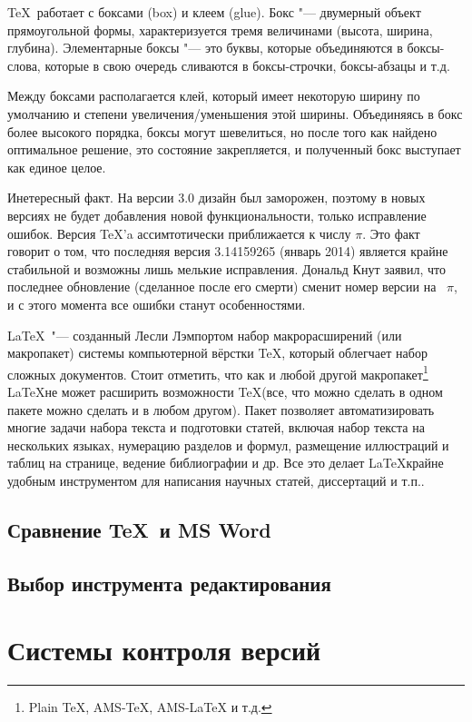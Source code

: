 \documentclass{article}
\begin{document}
		\TeX ~работает с боксами (box) и клеем (glue). Бокс "--- двумерный объект прямоугольной формы, характеризуется тремя 
величинами (высота, ширина, глубина). Элементарные боксы "--- это буквы, которые объединяются в боксы-слова, которые в свою очередь сливаются в боксы-строчки, боксы-абзацы и т.д.

        Между боксами располагается клей, который имеет некоторую ширину по умолчанию и степени увеличения/уменьшения этой ширины. Объединяясь в бокс более высокого порядка, боксы могут шевелиться, но после того как найдено оптимальное решение, это состояние закрепляется, и полученный бокс выступает как единое целое.
        
        Инетересный факт. На версии 3.0 дизайн был заморожен, поэтому в новых версиях не будет добавления новой функциональности, только исправление ошибок. Версия \TeX 'a ассимтотически приближается к числу $\pi$. Это факт говорит о том, что последняя версия	3.14159265 (январь 2014) является крайне стабильной и возможны лишь мелькие исправления. Дональд Кнут заявил, что последнее обновление (сделанное после его смерти) сменит номер версии на ~$\pi$, и с этого момента все ошибки станут особенностями.
        		
		\LaTeX ~"--- созданный Лесли Лэмпортом набор макрорасширений (или макропакет) системы компьютерной вёрстки \TeX, который облегчает набор сложных документов. Стоит отметить, что как и любой другой макропакет\footnote{ Plain TeX, AMS-TeX, AMS-LaTeX и т.д.} \LaTeX не может расширить возможности \TeX (все, что можно сделать в одном пакете можно сделать и в любом другом). Пакет позволяет автоматизировать многие задачи набора текста и подготовки статей, включая набор текста на нескольких языках, нумерацию разделов и формул, размещение иллюстраций и таблиц на странице, ведение библиографии и др. Все это делает \LaTeX крайне удобным инструментом для написания научных статей, диссертаций и т.п..
			
		\subsection{Сравнение \TeX ~и MS Word}
		\subsection{Выбор инструмента редактирования}
	\newpage
	\section{Системы контроля версий}
\end{document}
